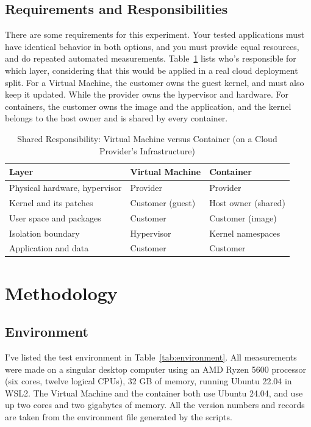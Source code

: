\documentclass[conference,a4paper]{IEEEtran}
\begin{document}
\subsection{Requirements and Responsibilities}
There are some requirements for this experiment. Your tested applications must have identical behavior in both options, and you must provide equal resources, and do repeated automated measurements. Table~\ref{tab:resp} lists who’s responsible for which layer, considering that this would be applied in a real cloud deployment split. For a Virtual Machine, the customer owns the guest kernel, and must also keep it updated. While the provider owns the hypervisor and hardware. For containers, the customer owns the image and the application, and the kernel belongs to the host owner and is shared by every container.

\begin{table}[htbp]
	\caption{Shared Responsibility: Virtual Machine versus Container (on a Cloud Provider's Infrastructure)}
	\begin{center}
		\footnotesize
		\begin{tabular}{|p{}|p{}|p{}|}
			\hline
			\textbf{Layer} & \textbf{Virtual Machine} & \textbf{Container} \\
			\hline
			Physical hardware, hypervisor & Provider & Provider \\
			\hline
			Kernel and its patches & Customer (guest) & Host owner (shared) \\
			\hline
			User space and packages & Customer & Customer (image) \\
			\hline
			Isolation boundary & Hypervisor & Kernel namespaces \\
			\hline
			Application and data & Customer & Customer \\
			\hline
		\end{tabular}
		\label{tab:resp}
	\end{center}
\end{table}

\section{Methodology}
\label{sec:methodology}
\subsection{Environment}
I’ve listed the test environment in Table~\ref{tab:environment}. All measurements were made on a singular desktop computer using an AMD Ryzen 5600 processor (six cores, twelve logical CPUs), 32 GB of memory, running Ubuntu 22.04 in WSL2. The Virtual Machine and the container both use Ubuntu 24.04, and use up two cores and two gigabytes of memory. All the version numbers and records are taken from the environment file generated by the scripts.
\end{document}
